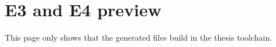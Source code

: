 \documentclass[11pt]{article}
\begin{document}
\section*{E3 and E4 preview}

This page only shows that the generated files build in the thesis toolchain.




\end{document}
